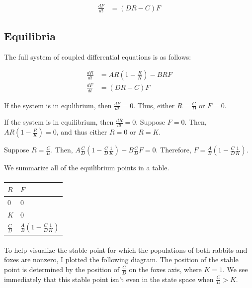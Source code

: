 \documentclass{article}
\begin{document}
\begin{align}
	\frac{dF}{dt} & = \left( D R - C \right) F
\end{align}

\subsection{Equilibria}

The full system of coupled differential equations is as follows:

\begin{align}
	\frac{dR}{dt} & = A R \left( 1 - \frac{R}{K} \right) - B R F\\
	\frac{dF}{dt} & = \left( D R - C \right) F
\end{align}

If the system is in equlibrium, then $\frac{dF}{dt} = 0$.
Thus, either $R = \frac{C}{D}$ or $F = 0$.

If the system is in equilibrium, then $\frac{dR}{dt} = 0$.
Suppose $F = 0$.
Then, $A R \left( 1 - \frac{R}{K} \right) = 0$, and thus
	either $R = 0$ or $R = K$.

Suppose $R = \frac{C}{D}$.
Then, $A \frac{C}{D} \left( 1 - \frac{C}{D} \frac{1}{K} \right) 
	- B \frac{C}{D} F = 0$.
Therefore, $F = \frac{A}{B} \left( 1 - \frac{C}{D} \frac{1}{K} \right)$.

We summarize all of the equilibrium points in a table.

\paragraph{}
\begin{tabular}{|l|l|}
\hline
$R$ & $F$ \\
\hline
$0$ & $0$ \\
\hline
$K$ & $0$ \\
\hline
$\frac{C}{D}$ & $\frac{A}{B} \left( 1 - \frac{C}{D} \frac{1}{K} \right)$ \\
\hline
\end{tabular}

\paragraph{}
To help visualize the stable point for which the populations 
	of both rabbits and foxes are nonzero, I plotted the following
	diagram.
The position of the stable point is determined by the position
	of $\frac{C}{D}$ on the foxes axis, where $K = 1$.
We see immediately that this stable point isn't even in the 
	state space when $\frac{C}{D} > K$.
\end{document}
